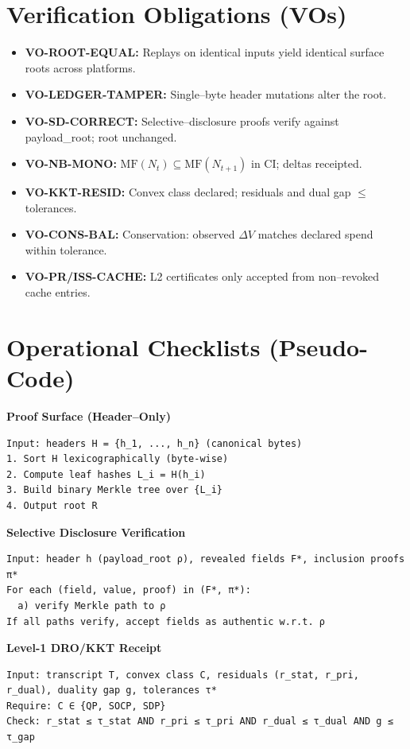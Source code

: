 \documentclass[11pt]{article}
\theoremstyle{plain}
\theoremstyle{definition}
\theoremstyle{remark}
\def\texttt#1{#1}%
\begin{document}
\section{Verification Obligations (VOs)}
\begin{itemize}
  \item \textbf{VO-ROOT-EQUAL:} Replays on identical inputs yield identical surface roots across platforms.
  \item \textbf{VO-LEDGER-TAMPER:} Single--byte header mutations alter the root.
  \item \textbf{VO-SD-CORRECT:} Selective--disclosure proofs verify against \texttt{payload\_root}; root unchanged.
  \item \textbf{VO-NB-MONO:} $\mathrm{MF}(N_t)\subseteq \mathrm{MF}(N_{t+1})$ in CI; deltas receipted.
  \item \textbf{VO-KKT-RESID:} Convex class declared; residuals and dual gap $\le$ tolerances.
  \item \textbf{VO-CONS-BAL:} Conservation: observed $\Delta V$ matches declared spend within tolerance.
  \item \textbf{VO-PR/ISS-CACHE:} L2 certificates only accepted from non--revoked cache entries.
\end{itemize}

\section{Operational Checklists (Pseudo-Code)}
\begin{auditbox}
\textbf{Proof Surface (Header--Only)}
\begin{verbatim}
Input: headers H = {h_1, ..., h_n} (canonical bytes)
1. Sort H lexicographically (byte-wise)
2. Compute leaf hashes L_i = H(h_i)
3. Build binary Merkle tree over {L_i}
4. Output root R
\end{verbatim}
\end{auditbox}

\begin{auditbox}
\textbf{Selective Disclosure Verification}
\begin{verbatim}
Input: header h (payload_root ρ), revealed fields F*, inclusion proofs π*
For each (field, value, proof) in (F*, π*):
  a) verify Merkle path to ρ
If all paths verify, accept fields as authentic w.r.t. ρ
\end{verbatim}
\end{auditbox}

\begin{auditbox}
\textbf{Level-1 DRO/KKT Receipt}
\begin{verbatim}
Input: transcript T, convex class C, residuals (r_stat, r_pri, r_dual), duality gap g, tolerances τ*
Require: C ∈ {QP, SOCP, SDP}
Check: r_stat ≤ τ_stat AND r_pri ≤ τ_pri AND r_dual ≤ τ_dual AND g ≤ τ_gap
\end{verbatim}
\end{auditbox}
\end{document}
